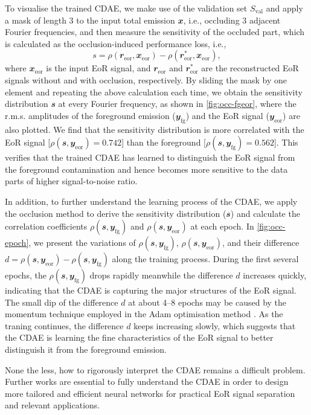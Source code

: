 \documentclass[fleqn,usenatbib]{mnras}
\newcommand{\R}[1]{\mathrm{#1}}
\newcommand{\B}[1]{\mathbfit{#1}}
\begin{document}
{To visualise the trained CDAE, we make use of the validation set
$S_{\R{val}}$ and apply a mask of length 3 to the input total emission
$\B{x}$, i.e., occluding 3 adjacent Fourier frequencies, and then measure
the sensitivity of the occluded part, which is calculated as the
occlusion-induced performance loss, i.e.,
\begin{equation}
  \label{eq:perf-loss}
  s = \rho(\B{r}_{\R{eor}}, \B{x}_{\R{eor}}) -
      \rho(\B{r}^*_{\R{eor}}, \B{x}_{\R{eor}}),
\end{equation}
where $\B{x}_{\R{eor}}$ is the input EoR signal, and
$\B{r}_{\R{eor}}$ and $\B{r}^*_{\R{eor}}$ are the reconstructed EoR signals
without and with occlusion, respectively.
By sliding the mask by one element and repeating the above calculation each
time, we obtain the sensitivity distribution $\B{s}$ at every Fourier
frequency, as shown in \autoref{fig:occ-fgeor}, where the r.m.s\@.
amplitudes of the foreground emission ($\B{y}_{\R{fg}}$) and the EoR signal
($\B{y}_{\R{eor}}$) are also plotted.
We find that the sensitivity distribution is more correlated with the EoR
signal [$\rho(\B{s}, \B{y}_{\R{eor}}) = 0.742$] than the foreground
[$\rho(\B{s}, \B{y}_{\R{fg}}) = 0.562$].
This verifies that the trained CDAE has learned to distinguish the EoR
signal from the foreground contamination and hence becomes more sensitive
to the data parts of higher signal-to-noise ratio.

In addition, to further understand the learning process of the CDAE, we
apply the occlusion method to derive the sensitivity distribution ($\B{s}$)
and calculate the correlation coefficients $\rho(\B{s}, \B{y}_{\R{fg}})$
and $\rho(\B{s}, \B{y}_{\R{eor}})$ at each epoch.
In \autoref{fig:occ-epoch}, we present the variations of
$\rho(\B{s}, \B{y}_{\R{fg}})$, $\rho(\B{s}, \B{y}_{\R{eor}})$, and their
difference $d = \rho(\B{s}, \B{y}_{\R{eor}}) - \rho(\B{s}, \B{y}_{\R{fg}})$
along the training process.
During the first several epochs, the $\rho(\B{s}, \B{y}_{\R{fg}})$ drops
rapidly meanwhile the difference $d$ increases quickly, indicating that the
CDAE is capturing the major structures of the EoR signal.
The small dip of the difference $d$ at about \numrange{4}{8} epochs may be
caused by the momentum technique employed in the Adam optimisation method
\citep{kingma2015}.
As the traning continues, the difference $d$ keeps increasing slowly, which
suggests that the CDAE is learning the fine characteristics of the EoR
signal to better distinguish it from the foreground emission.

None the less, how to rigorously interpret the CDAE remains a difficult
problem.
Further works are essential to fully understand the CDAE in order to design
more tailored and efficient neural networks for practical EoR signal
separation and relevant applications.
} %
\end{document}
